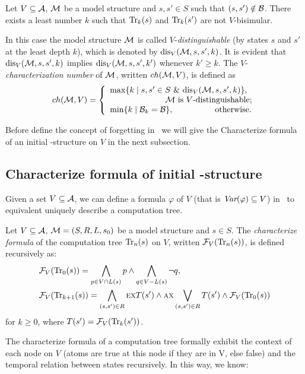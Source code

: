 \documentclass{article}
\begin{document}
\begin{proposition}\label{pro:k}
  Let $V\subseteq {\cal A}$, ${\cal M}$ be a model structure and $s,s'\in S$
  such that $(s,s')\notin \cal B$.
  There exists a least number $k$ such that
  $\textrm{Tr}_k(s)$ and $\textrm{Tr}_k(s')$ are not $V$-bisimular.
\end{proposition}
In this case the  model structure ${\cal M}$ is called $V$-{\em distinguishable} (by
states $s$ and $s'$ at the least depth $k$), which is denoted by $\textrm{dis}_V({\cal M},s,s',k)$.
It is evident that
$\textrm{dis}_V({\cal M},s,s',k)$ implies $\textrm{dis}_V({\cal M},s,s',k')$ whenever $k'\ge k$.
The $V$-{\em characterization number}
of ${\cal M}$, written $ch({\cal M},V)$, is defined as
\[ch({\cal M},V)=
\left\{
  \begin{array}{ll}
    \max\{k\mid s,s'\in S\ \&\ \textrm{dis}_V({\cal M},s,s',k)\},\\
         \ \ \qquad \qquad \qquad \hbox{${\cal M}$ is $V$-distinguishable;} \\
    \min\{k\mid {\cal B}_{k}={\cal B}\}, \ \ \ \qquad \qquad \hbox{otherwise.}
  \end{array}
\right.
\]



Before define the concept of forgetting in \CTL\, we will give the Characterize formula of an initial \MPK-structure on $V$ in the next subsection.

\subsection{Characterize formula of initial \MPK-structure}
Given a set $V\subseteq{\cal A}$, we can define a formula $\varphi$ of $V$ (that is $\textit{Var}(\varphi) \subseteq V$) in \CTL\ to equivalent uniquely describe a computation tree.
\begin{definition}\label{def:V:char:formula}
Let $V\subseteq {\cal A}$, ${\cal M} =(S,R,L,s_0)$ be a model structure and $s\in S$.
The {\em characterize formula} of the computation tree $\textrm{Tr}_n(s)$ on $V$,
written ${\cal F}_V(\textrm{Tr}_n(s))$, is defined recursively as:
\begin{align*}
  & {\cal F}_V(\textrm{Tr}_0(s)) = \bigwedge_{p \in V\cap L(s)}p
     \wedge \bigwedge_{q\in V-L(s)} \neg q,\\
  & {\cal F}_V(\textrm{Tr}_{k+1}(s)) = \bigwedge_{(s,s')\in R}
    \textsc{e} \textsc{x} T(s')
    \wedge
    \textsc{a} \textsc{x} \bigvee_{(s,s')\in R} T(s')
    \wedge {\cal F}_V(\textrm{Tr}_0(s))
\end{align*}
for $k\ge 0$, where $T(s') = {\cal F}_V(\textrm{Tr}_k(s'))$.
\end{definition}
The characterize formula of a computation tree formally exhibit the context of each node on $V$ (atoms are true at this node if they are in V, else false) and the temporal relation between states recursively. In this way, we know:
\end{document}
